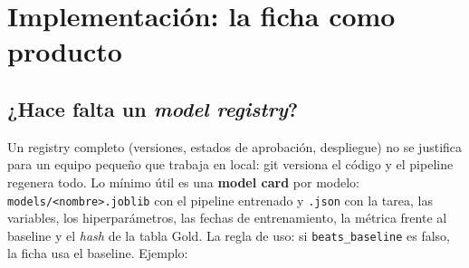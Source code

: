 \documentclass[11pt,a4paper]{article}
\begin{document}


\section{Implementación: la ficha como producto}\label{sec:implementacion}
\subsection{¿Hace falta un \emph{model registry}?}
Un registry completo (versiones, estados de aprobación, despliegue) no se justifica para un equipo pequeño que trabaja
en local: git versiona el código y el pipeline regenera todo. Lo mínimo útil es una \textbf{model card} por modelo:
\texttt{models/<nombre>.joblib} con el pipeline entrenado y \texttt{.json} con la tarea, las variables, los
hiperparámetros, las fechas de entrenamiento, la métrica frente al baseline y el \emph{hash} de la tabla Gold. La regla
de uso: si \texttt{beats\_baseline} es falso, la ficha usa el baseline. Ejemplo:

{\footnotesize{}}
\end{document}
